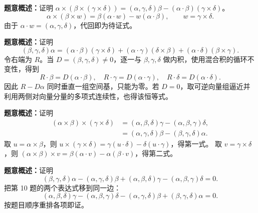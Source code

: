 \textbf{题意概述：}证明 $\alpha\times(\beta\times(\gamma\times\delta))=(\alpha,\gamma,\delta)\beta-(\alpha\cdot\beta)(\gamma\times\delta)$。
\[
\alpha\times(\beta\times w)
=\beta(\alpha\cdot w)-w(\alpha\cdot\beta),\qquad w=\gamma\times\delta.
\]
由于 $\alpha\cdot w=(\alpha,\gamma,\delta)$，代回即为待证式。

\textbf{题意概述：}证明
\[
(\beta,\gamma,\delta)\alpha=(\alpha\cdot\beta)(\gamma\times\delta)
+(\alpha\cdot\gamma)(\delta\times\beta)
+(\alpha\cdot\delta)(\beta\times\gamma).
\]
令右端为 $R$。当 $D=(\beta,\gamma,\delta)\ne0$，逐一与 $\beta,\gamma,\delta$ 做内积，使用混合积的循环不变性，得到
\[
R\cdot\beta=D(\alpha\cdot\beta),\quad
R\cdot\gamma=D(\alpha\cdot\gamma),\quad
R\cdot\delta=D(\alpha\cdot\delta).
\]
因此 $R-D\alpha$ 同时垂直一组空间基，只能为零。若 $D=0$，取可逆向量组逼近并利用两侧对向量分量的多项式连续性，也得该恒等式。

\textbf{题意概述：}证明
\begin{align*}
(\alpha\times\beta)\times(\gamma\times\delta)
&=(\alpha,\beta,\delta)\gamma-(\alpha,\beta,\gamma)\delta,\\
&=(\alpha,\gamma,\delta)\beta-(\beta,\gamma,\delta)\alpha.
\end{align*}
取 $u=\alpha\times\beta$，则 $u\times(\gamma\times\delta)=\gamma(u\cdot\delta)-\delta(u\cdot\gamma)$，得第一式。
取 $v=\gamma\times\delta$，则 $(\alpha\times\beta)\times v=\beta(\alpha\cdot v)-\alpha(\beta\cdot v)$，得第二式。

\textbf{题意概述：}证明
\[
(\beta,\gamma,\delta)\alpha-(\alpha,\gamma,\delta)\beta
+(\alpha,\beta,\delta)\gamma-(\alpha,\beta,\gamma)\delta=0.
\]
把第 10 题的两个表达式移到同一边：
\[
(\alpha,\beta,\delta)\gamma-(\alpha,\beta,\gamma)\delta
-(\alpha,\gamma,\delta)\beta+(\beta,\gamma,\delta)\alpha=0.
\]
按题目顺序重排各项即证。

